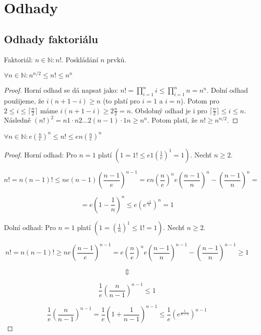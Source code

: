 \chapter{Odhady}

\section{Odhady faktoriálu}

Faktoriál: $n \in \mathbb{N}: n!$. Poskládání $n$ prvků.

\begin{tvrz}
	$\forall n \in \mathbb{N}: n^{n/2} \leq n! \leq n^n$
\end{tvrz}

\begin{proof}
	Horní odhad se dá napsat jako: $n! = \prod_{i=1}^{n}i \leq \prod_{i=1}^{n} n = n^{n}$. Dolní odhad použijeme, že $i(n+1 - i) \geq n$ (to platí pro $i=1$ a $i=n$). Potom pro $2 \leq i \leq \lceil \frac{n}{2} \rceil$ máme $i(n+1-i) \geq 2 \frac{n}{2} = n$. Obdobný odhad je i pro $\lceil \frac{n}{2} \rceil \leq i \leq n$. Následně $(n!)^2 = n1 \cdot n2 \dots 2(n-1) \cdot 1n \geq n^{n}$. Potom platí, že $n! \geq n^{n/2}$.
\end{proof}

\begin{veta}
	$\forall n \in \mathbb{N}: e (\frac{n}{e})^n \leq n! \leq en(\frac{n}{e})^n$
\end{veta}

\begin{proof}
	Horní odhad: Pro $n = 1$ platí $(1 = 1! \leq e 1 \left( \frac{1}{e} \right)^{1} = 1)$. Nechť $n \geq 2$.
	
	$$
	n! = n (n-1)! \leq n e (n-1)\left( \frac{n-1}{e} \right)^{n-1} = e n \left( \frac{n}{e} \right)^{n}e \left( \frac{n-1}{n} \right)^{n} - \left( \frac{n-1}{n} \right)^{n} =
	$$
	
	$$
	= e \left( 1 - \frac{1}{n} \right)^{n} \leq e \left( e^{\frac{-1}{n}} \right)^{n} = 1
	$$
	
	Dolní odhad: Pro $n = 1$ platí $(1 = \left( \frac{1}{n} \right)^{1} \leq 1! = 1)$. Nechť $n \geq 2$.
	
	$$
	n! = n(n-1)! \geq n e \left( \frac{n-1}{e} \right)^{n-1} = e \left( \frac{n}{e} \right)^{n} e \left( \frac{n-1}{n} \right)^{n-1} - \left( \frac{n-1}{n} \right)^{n-1} \geq 1
	$$
	
	$$
	\Updownarrow
	$$
	
	$$
	\frac{1}{e} \left( \frac{n}{n-1} \right)^{n-1} \leq 1
	$$
	
	$$
	\frac{1}{e} \left( \frac{n}{n-1} \right)^{n-1} = \frac{1}{e} \left( 1 + \frac{1}{n-1} \right)^{n-1} \leq \frac{1}{e} \left( e^{\frac{1}{n-1}} \right)^{n-1}
	$$
\end{proof}

